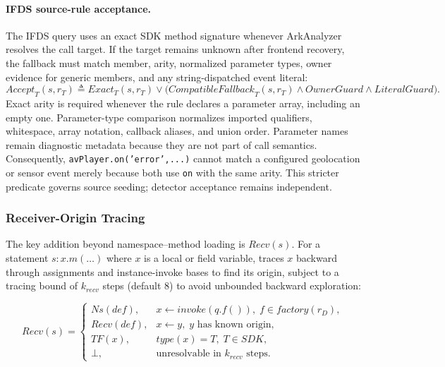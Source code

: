 \paragraph{IFDS source-rule acceptance.}
The IFDS query uses an exact SDK method signature whenever ArkAnalyzer resolves the call target. If the target remains unknown after frontend recovery, the fallback must match member, arity, normalized parameter types, owner evidence for generic members, and any string-dispatched event literal:
\begin{equation}
\mathit{Accept}_T(s,r_T)\triangleq
\mathit{Exact}_T(s,r_T)\lor
\bigl(\mathit{CompatibleFallback}_T(s,r_T)\land
\mathit{OwnerGuard}\land\mathit{LiteralGuard}\bigr).
\end{equation}
Exact arity is required whenever the rule declares a parameter array, including an empty one. Parameter-type comparison normalizes imported qualifiers, whitespace, array notation, callback aliases, and union order. Parameter names remain diagnostic metadata because they are not part of call semantics. Consequently, \texttt{avPlayer.on('error',...)} cannot match a configured geolocation or sensor event merely because both use \texttt{on} with the same arity. This stricter predicate governs source seeding; detector acceptance remains independent.

\subsubsection{Receiver-Origin Tracing}

The key addition beyond namespace--method loading is $\mathit{Recv}(s)$. For a statement $s: x.m(\ldots)$ where $x$ is a local or field variable, \mytool traces $x$ backward through assignments and instance-invoke bases to find its origin, subject to a tracing bound of $k_{recv}$ steps (default 8) to avoid unbounded backward exploration:

\begin{equation}
\mathit{Recv}(s) \!=\!
\begin{cases}
\mathit{Ns}(def), & x {\leftarrow} invoke(q.f()),\;f{\in}factory(r_D),\\
\mathit{Recv}(def), & x {\leftarrow} y,\;y\text{ has known origin},\\
\mathit{TF}(x), & \mathit{type}(x){=}T,\;T{\in}\mathit{SDK},\\
\bot, & \text{unresolvable in }k_{recv}\text{ steps.}
\end{cases}
\end{equation}

